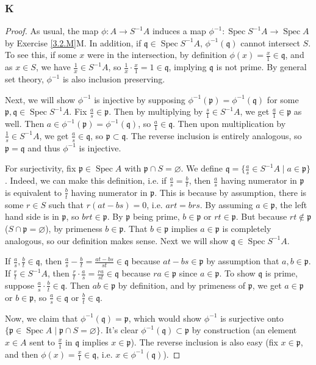 \documentclass{article}
\newcommand{\frkp}{\mathfrak{p}}
\newcommand{\frkq}{\mathfrak{q}}
\DeclareMathOperator{\Spec}{\mathrm{Spec}}
\let\emptyset\varnothing
\begin{document}
\subsubsection{K}\label{3.2.K}
\begin{proof}
    As usual, the map $\phi:A\to S^{-1}A$ induces a map $\phi^{-1}:\Spec S^{-1}A \to \Spec A$ by Exercise \ref{3.2.M}M. In addition, if $\frkq \in \Spec S^{-1}A$, $\phi^{-1}(\frkq)$ cannot intersect $S$. To see this, if some $x$ were in the intersection, by definition $\phi(x)=\frac{x}{1}\in \frkq$, and as $x\in S$, we have $\frac{1}{x}\in S^{-1}A$, so $\frac{1}{x}\cdot \frac{x}{1}=1 \in \frkq$, implying $\frkq$ is not prime. By general set theory, $\phi^{-1}$ is also inclusion preserving.

    Next, we will show $\phi^{-1}$ is injective by supposing $\phi^{-1}(\frkp)=\phi^{-1}(\frkq)$ for some $\frkp,\frkq \in \Spec S^{-1}A$. Fix $\frac{a}{s}\in \frkp$. Then by multiplying by $\frac{s}{1}\in S^{-1}A$, we get $\frac{a}{1}\in \frkp$ as well. Then $a\in \phi^{-1}(\frkp)=\phi^{-1}(\frkq)$, so $\frac{a}{1}\in \frkq$. Then upon multiplication by $\frac{1}{s}\in S^{-1}A$, we get $\frac{a}{s}\in \frkq$, so $\frkp\subset \frkq$. The reverse inclusion is entirely analogous, so $\frkp=\frkq$ and thus $\phi^{-1}$ is injective.

    For surjectivity, fix $\frkp\in \Spec A$ with $\frkp \cap S=\emptyset$. We define $\frkq = \{ \frac{a}{s}\in S^{-1}A \mid a \in \frkp \}$. Indeed, we can make this definition, i.e. if $\frac{a}{s}=\frac{b}{t}$, then $\frac{a}{s}$ having numerator in $\frkp$ is equivalent to $\frac{b}{t}$ having numerator in $\frkp$. This is because by assumption, there is some $r\in S$ such that $r(at-bs)=0$, i.e. $art=brs$. By assuming $a\in \frkp$, the left hand side is in $\frkp$, so $brt\in \frkp$. By $\frkp$ being prime, $b\in \frkp$ or $rt\in \frkp$. But because $rt\notin \frkp$ ($S\cap \frkp=\emptyset$), by primeness $b\in \frkp$. That $b\in \frkp$ implies $a\in \frkp$ is completely analogous, so our definition makes sense. Next we will show $\frkq \in \Spec S^{-1}A$.

    If $\frac{a}{s}, \frac{b}{t}\in \frkq$, then $\frac{a}{s}-\frac{b}{t}=\frac{at-bs}{st}\in \frkq$ because $at-bs\in \frkp$ by assumption that $a,b\in \frkp$. If $\frac{r}{t}\in S^{-1}A$, then $\frac{r}{t}\cdot \frac{a}{s}=\frac{ra}{st}\in \frkq$ because $ra\in \frkp$ since $a\in \frkp$. To show $\frkq$ is prime, suppose $\frac{a}{s}\cdot \frac{b}{t}\in \frkq$. Then $ab\in \frkp$ by definition, and by primeness of $\frkp$, we get $a\in \frkp$ or $b\in \frkp$, so $\frac{a}{s}\in \frkq$ or $\frac{b}{t}\in \frkq$.

    Now, we claim that $\phi^{-1}(\frkq)=\frkp$, which would show $\phi^{-1}$ is surjective onto $\{\frkp\in \Spec A \mid \frkp \cap S = \emptyset\}$. It's clear $\phi^{-1}(\frkq)\subset \frkp$ by construction (an element $x\in A$ sent to $\frac{x}{1}$ in $\frkq$ implies $x\in \frkp$). The reverse inclusion is also easy (fix $x\in \frkp$, and then $\phi(x)=\frac{x}{1}\in \frkq$, i.e. $x\in \phi^{-1}(\frkq)$).
\end{proof}
\end{document}
